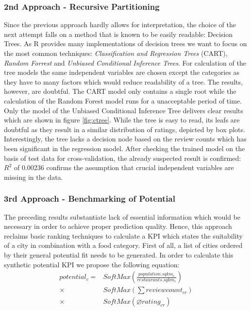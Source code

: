 \subsubsection{2nd Approach - Recursive Partitioning}
Since the previous approach hardly allows for interpretation, the choice of the next attempt falls on a method that is known to be easily readable: Decision Trees. As R provides many implementations of decision trees we want to focus on the most common techniques: \textit{Classification and Regression Trees} (CART), \textit{Random Forrest} and \textit{Unbiased Conditional Inference Trees}.\newline
For calculation of the tree models the same independent variables are chosen except the categories as they have to many factors which would reduce readability of a tree. The results, however, are doubtful. The CART model only contains a single root while the calculation of the Random Forest model runs for a unacceptable period of time. Only the model of the Unbiased Conditional Inference Tree delivers clear results which are shown in figure \ref{fig:ctree}.
While the tree is easy to read, its leafs are doubtful as they result in a similar distribution of ratings, depicted by box plots.
Interestingly, the tree lacks a decision node based on the review counts which has been significant in the regression model.
After checking the trained model on the basis of test data for cross-validation, the already suspected result is confirmed: $R^2$ of 0.00236 confirms the assumption that crucial independent variables are missing in the data.

\subsubsection{3rd Approach - Benchmarking of Potential}
\label{subsubsec:potential}
The preceding results substantiate lack of essential information which would be necessary in order to achieve proper prediction quality. Hence, this approach reclaims basic ranking techniques to calculate a \ac{KPI} which states the suitability of a city in combination with a food category.\newline
First of all, a list of cities ordered by their general potential fit needs to be generated. In order to calculate this synthetic potential \ac{KPI}  we propose the following equation:
\begin{equation}
\begin{aligned}
	potential_c = &SoftMax(\frac{population.sqkm_c}{restaurants.sqkm_c})  \\
	\times & SoftMax(\textstyle \sum reviewcount_{cr})  \\
	\times & SoftMax(\varnothing rating_{cr}) %
\end{aligned}
\label{eq:potential_benchmark}
\end{equation}

